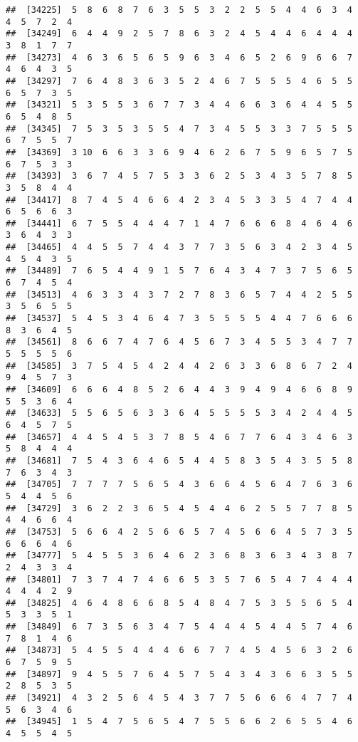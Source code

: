 \documentclass[
]{book}
\begin{document}
\begin{verbatim}
##  [34225]  5  8  6  8  7  6  3  5  5  3  2  2  5  5  4  4  6  3  4  4  5  7  2  4
##  [34249]  6  4  4  9  2  5  7  8  6  3  2  4  5  4  4  6  4  4  4  3  8  1  7  7
##  [34273]  4  6  3  6  5  6  5  9  6  3  4  6  5  2  6  9  6  6  7  4  6  4  3  5
##  [34297]  7  6  4  8  3  6  3  5  2  4  6  7  5  5  5  4  6  5  5  6  5  7  3  5
##  [34321]  5  3  5  5  3  6  7  7  3  4  4  6  6  3  6  4  4  5  5  6  5  4  8  5
##  [34345]  7  5  3  5  3  5  5  4  7  3  4  5  5  3  3  7  5  5  5  6  7  5  5  7
##  [34369]  3 10  6  6  3  3  6  9  4  6  2  6  7  5  9  6  5  7  5  6  7  5  3  3
##  [34393]  3  6  7  4  5  7  5  3  3  6  2  5  3  4  3  5  7  8  5  3  5  8  4  4
##  [34417]  8  7  4  5  4  6  6  4  2  3  4  5  3  3  5  4  7  4  4  6  5  6  6  3
##  [34441]  6  7  5  5  4  4  4  7  1  4  7  6  6  6  8  4  6  4  6  3  6  4  3  3
##  [34465]  4  4  5  5  7  4  4  3  7  7  3  5  6  3  4  2  3  4  5  4  5  4  3  5
##  [34489]  7  6  5  4  4  9  1  5  7  6  4  3  4  7  3  7  5  6  5  6  7  4  5  4
##  [34513]  4  6  3  3  4  3  7  2  7  8  3  6  5  7  4  4  2  5  5  3  5  6  5  5
##  [34537]  5  4  5  3  4  6  4  7  3  5  5  5  5  4  4  7  6  6  6  8  3  6  4  5
##  [34561]  8  6  6  7  4  7  6  4  5  6  7  3  4  5  5  3  4  7  7  5  5  5  5  6
##  [34585]  3  7  5  4  5  4  2  4  4  2  6  3  3  6  8  6  7  2  4  9  4  5  7  3
##  [34609]  6  6  6  4  8  5  2  6  4  4  3  9  4  9  4  6  6  8  9  5  5  3  6  4
##  [34633]  5  5  6  5  6  3  3  6  4  5  5  5  5  3  4  2  4  4  5  6  4  5  7  5
##  [34657]  4  4  5  4  5  3  7  8  5  4  6  7  7  6  4  3  4  6  3  5  8  4  4  4
##  [34681]  7  5  4  3  6  4  6  5  4  4  5  8  3  5  4  3  5  5  8  7  6  3  4  3
##  [34705]  7  7  7  7  5  6  5  4  3  6  6  4  5  6  4  7  6  3  6  5  4  4  5  6
##  [34729]  3  6  2  2  3  6  5  4  5  4  4  6  2  5  5  7  7  8  5  4  4  6  6  4
##  [34753]  5  6  6  4  2  5  6  6  5  7  4  5  6  6  4  5  7  3  5  6  6  6  4  6
##  [34777]  5  4  5  5  3  6  4  6  2  3  6  8  3  6  3  4  3  8  7  2  4  3  3  4
##  [34801]  7  3  7  4  7  4  6  6  5  3  5  7  6  5  4  7  4  4  4  4  4  4  2  9
##  [34825]  4  6  4  8  6  6  8  5  4  8  4  7  5  3  5  5  6  5  4  5  3  3  5  1
##  [34849]  6  7  3  5  6  3  4  7  5  4  4  4  5  4  4  5  7  4  6  7  8  1  4  6
##  [34873]  5  4  5  5  4  4  4  6  6  7  7  4  5  4  5  6  3  2  6  6  7  5  9  5
##  [34897]  9  4  5  5  7  6  4  5  7  5  4  3  4  3  6  6  3  5  5  2  8  5  3  5
##  [34921]  4  3  2  5  6  4  5  4  3  7  7  5  6  6  6  4  7  7  4  5  6  3  4  6
##  [34945]  1  5  4  7  5  6  5  4  7  5  5  6  6  2  6  5  5  4  6  4  5  5  4  5

\end{verbatim}
\end{document}
